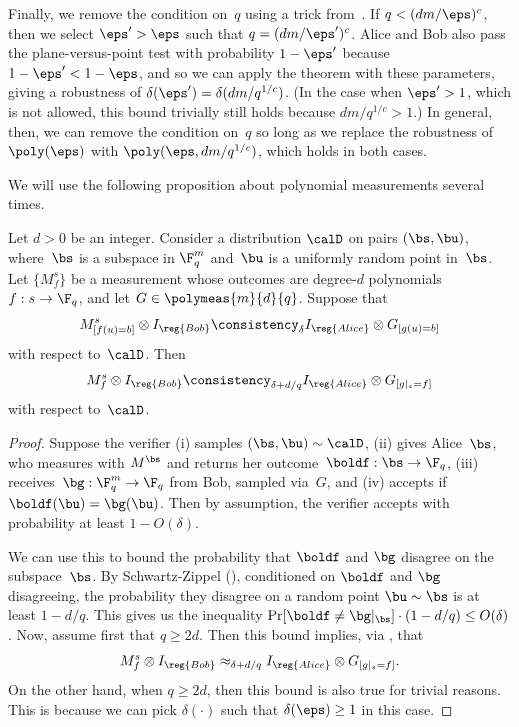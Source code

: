 \begin{remark}
Finally, we remove the condition on~$q$ using a trick from~\cite{NV18a}. If $q < (dm/\eps)^c$, then we select $\eps' > \eps$ such that $q = (dm/\eps')^c$.
Alice and Bob also pass the plane-versus-point test with probability $1-\eps'$ because $1-\eps' < 1-\eps$, and so we can apply the theorem with these parameters,
giving a robustness of $\delta(\eps') = \delta(dm/q^{1/c})$.
(In the case when $\eps' > 1$, which is not allowed, this bound trivially still holds because $dm/q^{1/c} > 1$.)
In general, then, we can remove the condition on~$q$ so long as we replace the robustness of $\poly(\eps)$ with $\poly(\eps, dm/q^{1/c})$, which holds in both cases.
\end{remark}

We will use the following proposition about polynomial measurements several times.

\begin{proposition}\label{prop:same-on-point-same-on-subspace}
Let $d > 0$ be an integer.
Consider a distribution $\calD$ on pairs $(\bs, \bu)$, where~$\bs$ is a subspace in $\F_q^m$ and~$\bu$ is a uniformly random point in~$\bs$.
Let $\{M^s_f\}$ be a measurement whose outcomes are degree-$d$ polynomials $f:s \rightarrow \F_q$,
and let $G \in \polymeas{m}{d}{q}$.
Suppose that
\begin{equation*}
M^s_{[f(u) = b]} \otimes I_{\reg{Bob}} \consistency_\delta I_{\reg{Alice}} \otimes G_{[g(u) = b]}
\end{equation*}
with respect to~$\calD$. Then
\begin{equation*}
M^s_{f} \otimes I_{\reg{Bob}} \consistency_{\delta+d/q} I_{\reg{Alice}} \otimes G_{[g|_s = f]}
\end{equation*}
with respect to~$\calD$.
\end{proposition}
\begin{proof}
Suppose the verifier (i)  samples $(\bs, \bu) \sim \calD$,
(ii) gives Alice~$\bs$, who measures with $M^{\bs}$ and returns her outcome~$\boldf : \bs \rightarrow \F_q$,
(iii) receives~$\bg : \F_q^m \rightarrow \F_q$ from Bob, sampled via~$G$,
and (iv) accepts if $\boldf(\bu) = \bg(\bu)$.
Then by assumption, the verifier accepts with probability at least $1-O(\delta)$.

We can use this to bound the probability that $\boldf$ and $\bg$ disagree on the subspace~$\bs$.
By Schwartz-Zippel (), conditioned on $\boldf$ and $\bg$ disagreeing,
the probability they disagree on a random point $\bu \sim \bs$  is at least $1-d/q$.
This gives us the inequality $\Pr[\boldf \neq \bg|_{\bs}] \cdot (1-d/q) \leq O(\delta)$.
Now, assume first that $q \geq 2d$. Then this bound implies, via , that
\begin{equation}\label{eq:almost-there-almost-there}
M^s_f \otimes I_{\reg{Bob}} \approx_{\delta + d/q} I_{\reg{Alice}} \otimes G_{[g|_{s} = f]}.
\end{equation}
On the other hand, when $q \geq 2d$, then this bound is also true for trivial reasons.
This is because we can pick $\delta(\cdot)$ such that $\delta(\eps) \geq 1$ in this case.
\end{proof}

